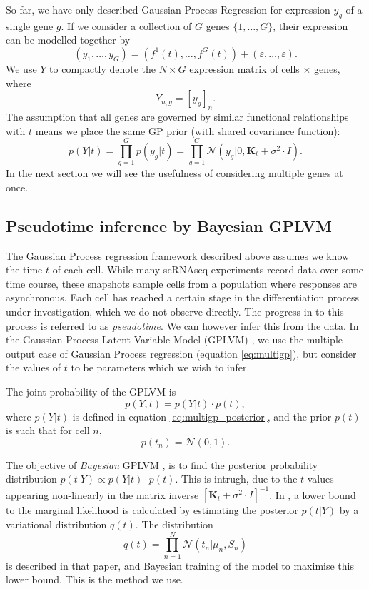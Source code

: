 So far, we have only described Gaussian Process Regression for expression $ y_g $ of a single gene $ g $. If we consider a collection of $ G $ genes $ \{1, \ldots, G\} $, their expression can be modelled together by
\begin{equation}
\label{eq:multigp}
(y_{1}, \ldots, y_{G}) = (f^{1}(t), \ldots, f^{G}(t)) + (\varepsilon, \ldots, \varepsilon).
\end{equation}
We use $ Y $ to compactly denote the $ N \times G $ expression matrix of cells $ \times $ genes, where
\[ Y_{n, g} = [y_{g}]_n. \]
The assumption that all genes are governed by similar functional relationships with $ t $ means we place the same GP prior (with shared covariance function):
\begin{equation}
\label{eq:multigp_posterior}
p(Y | t) = \prod_{g = 1}^G p(y_{g} | t) = \prod_{g = 1}^G \mathcal{N}(y_{g} | 0, \bm{K}_{t} + \sigma^2 \cdot I).
\end{equation}
In the next section we will see the usefulness of considering multiple genes at once.

\subsection{Pseudotime inference by Bayesian GPLVM}

The Gaussian Process regression framework described above assumes we know the time $ t $ of each cell. While many scRNAseq experiments record data over some time course, these snapshots sample cells from a population where responses are asynchronous. Each cell has reached a certain stage in the differentiation process under investigation, which we do not observe directly. The progress in to this process is referred to as \textit{pseudotime}. We can however infer this from the data. In the Gaussian Process Latent Variable Model (GPLVM) \cite{Lawrence2006-it}, we use the multiple output case of Gaussian Process regression (equation \ref{eq:multigp}), but consider the values of $ t $ to be parameters which we wish to infer.

The joint probability of the GPLVM is
\[ p(Y, t) = p(Y | t) \cdot p(t), \]
where $ p(Y | t) $ is defined in equation \ref{eq:multigp_posterior}, and the prior $ p(t) $ is such that for cell $ n $,
\[ p(t_n) = \mathcal{N}(0, 1). \]

The objective of \textit{Bayesian} GPLVM \cite{Titsias2010-hq}, is to find the posterior probability distribution $ p(t | Y) \propto p(Y | t) \cdot p(t) $. This is intrugh, due to the $ t $ values appearing non-linearly in the matrix inverse $ [\bm{K}_t + \sigma^2 \cdot I]^{-1} $. In \cite{Titsias2010-hq}, a lower bound to the marginal likelihood is calculated by estimating the  posterior $ p(t | Y) $ by a variational distribution $ q(t). $ The distribution
\[ q(t) = \prod_{n=1}^N \mathcal{N} (t_n | \mu_n, S_n ) \]
is described in that paper, and Bayesian training of the model to maximise this lower bound. This is the method we use.

